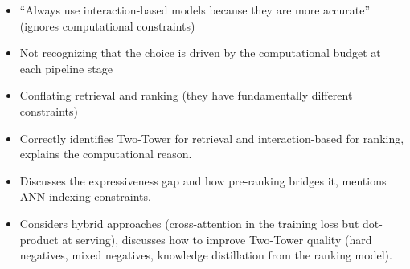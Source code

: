 \begin{interviewq}
\redflags
\begin{itemize}
    \item ``Always use interaction-based models because they are more accurate'' (ignores computational constraints)
    \item Not recognizing that the choice is driven by the computational budget at each pipeline stage
    \item Conflating retrieval and ranking (they have fundamentally different constraints)
\end{itemize}


\goodgreat
\begin{itemize}
    \item {} Correctly identifies Two-Tower for retrieval and interaction-based for ranking, explains the computational reason.
    \item {} Discusses the expressiveness gap and how pre-ranking bridges it, mentions ANN indexing constraints.
    \item {} Considers hybrid approaches (cross-attention in the training loss but dot-product at serving), discusses how to improve Two-Tower quality (hard negatives, mixed negatives, knowledge distillation from the ranking model).
\end{itemize}

\end{interviewq}

